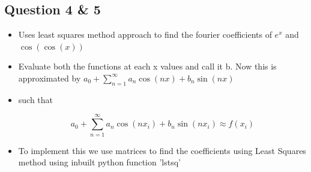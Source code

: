 \documentclass[11pt, a4paper]{article}
\begin{document}
       \subsection{Question 4 \& 5}\label{question-4-5}

       \begin{itemize}
       \item
         Uses least squares method approach to find the fourier coefficients of
         \(e^{x}\) and \(\cos(\cos(x))\)
       \item
         Evaluate both the functions at each x values and call it b. Now this
         is approximated by
         \(a_{0} + \sum\limits_{n=1}^{\infty} {{a_{n}\cos(nx)+b_{n}\sin(nx)}}\)
       \item
         such that
       
         \begin{equation}
         a_{0} + \sum\limits_{n=1}^{\infty} {{a_{n}\cos(nx_{i})+b_{n}\sin(nx_{i})}} \approx f(x_{i}) 
         \end{equation}
       \item
         To implement this we use matrices to find the coefficients using Least
         Squares method using inbuilt python function 'lstsq'
       \end{itemize}
\end{document}
